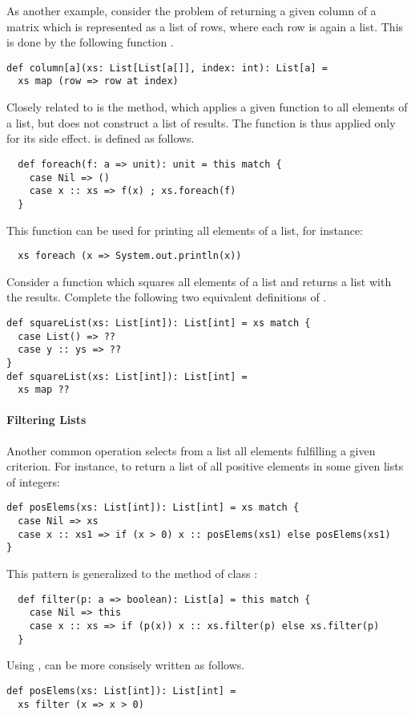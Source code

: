 As another example, consider the problem of returning a given column
of a matrix which is represented as a list of rows, where each row is
again a list. This is done by the following function .

\begin{lstlisting}
def column[a](xs: List[List[a[]], index: int): List[a] = 
  xs map (row => row at index)
\end{lstlisting}

Closely related to  is the  method, which
applies a given function to all elements of a list, but does not
construct a list of results. The function is thus applied only for its
side effect.  is defined as follows.
\begin{lstlisting}
  def foreach(f: a => unit): unit = this match {
    case Nil => ()
    case x :: xs => f(x) ; xs.foreach(f)
  }
\end{lstlisting}
This function can be used for printing all elements of a list, for instance:
\begin{lstlisting}
  xs foreach (x => System.out.println(x))
\end{lstlisting} 

\begin{exercise} Consider a function which squares all elements of a list and
returns a list with the results. Complete the following two equivalent
definitions of .

\begin{lstlisting}
def squareList(xs: List[int]): List[int] = xs match {
  case List() => ??
  case y :: ys => ??
}
def squareList(xs: List[int]): List[int] = 
  xs map ??
\end{lstlisting}
\end{exercise}

\paragraph{Filtering Lists}
Another common operation selects from a list all elements fulfilling a
given criterion. For instance, to return a list of all positive
elements in some given lists of integers:
\begin{lstlisting}
def posElems(xs: List[int]): List[int] = xs match {
  case Nil => xs
  case x :: xs1 => if (x > 0) x :: posElems(xs1) else posElems(xs1)
}
\end{lstlisting}
This pattern is generalized to the  method of class :
\begin{lstlisting}
  def filter(p: a => boolean): List[a] = this match {
    case Nil => this
    case x :: xs => if (p(x)) x :: xs.filter(p) else xs.filter(p)
  }
\end{lstlisting}
Using ,  can be more consisely written as
follows.
\begin{lstlisting}
def posElems(xs: List[int]): List[int] = 
  xs filter (x => x > 0)
\end{lstlisting}

